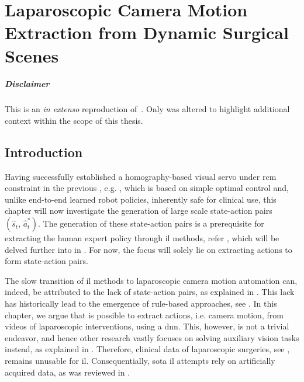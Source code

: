 \graphicspath{{chapter_3}}
\chapter[Laparoscopic Camera Motion Extraction]{Laparoscopic Camera Motion Extraction from Dynamic Surgical Scenes}
\label{chap:camera_motion_extraction}
\minitoc

\paragraph{Disclaimer} This  is an \textit{in extenso} reproduction of~\cite{huber2022deep}. Only  was altered to highlight additional context within the scope of this thesis.

\newpage

\section{Introduction}
\label{c3:sec:introduction}
Having successfully established a homography-based visual servo under \gls{rcm} constraint in the previous , e.g. , which is based on simple optimal control and, unlike end-to-end learned robot policies, inherently safe for clinical use, this chapter will now investigate the generation of large scale state-action pairs $(\hat{s}_t,\,\hat{a}^*_t)$. The generation of these state-action pairs is a prerequisite for extracting the human expert policy through \gls{il} methods, refer , which will be delved further into in . For now, the focus will solely lie on extracting actions to form state-action pairs.

The slow transition of \gls{il} methods to laparoscopic camera motion automation can, indeed, be attributed to the lack of state-action pairs, as explained in . This lack has historically lead to the emergence of rule-based approaches, see .
In this chapter, we argue that is possible to extract actions, i.e. camera motion, from videos of laparoscopic interventions, using a \gls{dnn}. This, however, is not a trivial endeavor, and hence other research vastly focuses on solving auxiliary vision tasks instead, as explained in . Therefore, clinical data of laparoscopic surgeries, see , remains unusable for \gls{il}. Consequentially, \gls{sota} \gls{il} attempts rely on artificially acquired data, as was reviewed in .

